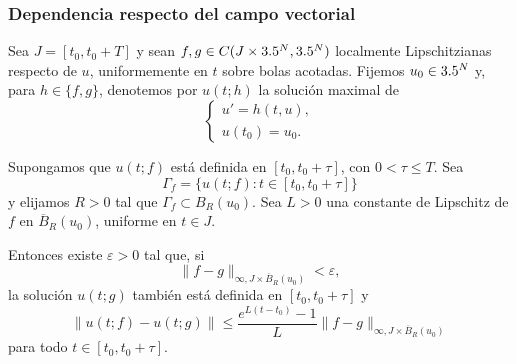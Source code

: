 \subsubsection{Dependencia respecto del campo vectorial}

\begin{teorema}
    Sea $J=[t_0,t_0+T]$ y sean $f,g\in C(J\times3.5^N,3.5^N)$ localmente Lipschitzianas respecto de $u$, uniformemente en $t$ sobre bolas acotadas. Fijemos $u_0\in3.5^N$ y, para $h\in\{f,g\}$, denotemos por $u(t;h)$ la solución maximal de
    \[
        \begin{cases}
            u'=h(t,u),\\
            u(t_0)=u_0.
        \end{cases}
    \]

    Supongamos que $u(t;f)$ está definida en $[t_0,t_0+\tau]$, con $0<\tau\leq T$. Sea
    \[
        \Gamma_f=\{u(t;f):t\in[t_0,t_0+\tau]\}
    \]
    y elijamos $R>0$ tal que $\Gamma_f\subset B_R(u_0)$. Sea $L>0$ una constante de Lipschitz de $f$ en $\overline{B}_R(u_0)$, uniforme en $t\in J$.

    Entonces existe $\varepsilon>0$ tal que, si
    \[
        \|f-g\|_{\infty,J\times\overline{B}_R(u_0)}<\varepsilon,
    \]
    la solución $u(t;g)$ también está definida en $[t_0,t_0+\tau]$ y
    \[
        \|u(t;f)-u(t;g)\|
        \leq
        \frac{e^{L(t-t_0)}-1}{L}
        \|f-g\|_{\infty,J\times\overline{B}_R(u_0)}
    \]
    para todo $t\in[t_0,t_0+\tau]$.
\end{teorema}

